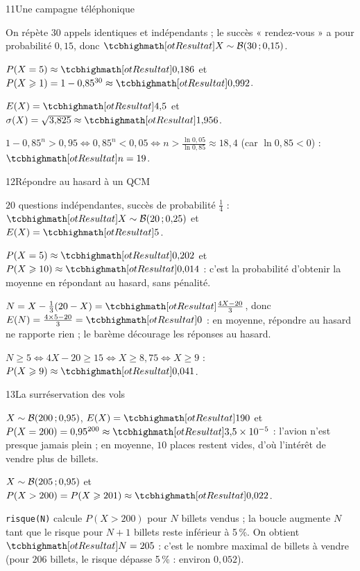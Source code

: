 \begin{corrige}{11}{Une campagne téléphonique}
\begin{questions}
  \item On répète $30$ appels identiques et indépendants ; le succès « rendez-vous » a pour probabilité $0{,}15$, donc
    $\res{X\sim\mathcal{B}(30\pv0{,}15)}$.
  \item $P(X=5)\approx\res{0{,}186}$ et $P(X\geq1)=1-0{,}85^{30}\approx\res{0{,}992}$.
  \item $E(X)=\res{4{,}5}$ et $\sigma(X)=\sqrt{3{,}825}\approx\res{1{,}956}$.
  \item $1-0{,}85^{n}>0{,}95\iff0{,}85^{n}<0{,}05\iff n>\frac{\ln0{,}05}{\ln0{,}85}\approx18{,}4$ (car $\ln0{,}85<0$) : $\res{n=19}$.
\end{questions}
\end{corrige}

\begin{corrige}{12}{Répondre au hasard à un QCM}
\begin{questions}
  \item $20$ questions indépendantes, succès de probabilité $\frac14$ : $\res{X\sim\mathcal{B}(20\pv0{,}25)}$ et $E(X)=\res{5}$.
  \item $P(X=5)\approx\res{0{,}202}$ et $P(X\geq10)\approx\res{0{,}014}$ : c'est la probabilité d'obtenir la moyenne en répondant au
    hasard, sans pénalité.
  \item $N=X-\frac13(20-X)=\res{\frac{4X-20}{3}}$, donc $E(N)=\frac{4\times5-20}{3}=\res{0}$ : en moyenne, répondre au hasard ne
    rapporte rien ; le barème décourage les réponses au hasard.
  \item $N\geq5\iff4X-20\geq15\iff X\geq8{,}75\iff X\geq9$ : $P(X\geq9)\approx\res{0{,}041}$.
\end{questions}
\end{corrige}

\begin{corrige}{13}{La surréservation des vols}
\begin{questions}
  \item $X\sim\mathcal{B}(200\,{;}\,0{,}95)$, $E(X)=\res{190}$ et $P(X=200)=0{,}95^{200}\approx\res{3{,}5\times10^{-5}}$ : l'avion n'est
    presque jamais plein ; en moyenne, $10$ places restent vides, d'où l'intérêt de vendre plus de billets.
  \item $X\sim\mathcal{B}(205\,{;}\,0{,}95)$ et $P(X>200)=P(X\geq201)\approx\res{0{,}022}$.
  \item \texttt{risque(N)} calcule $P(X>200)$ pour $N$ billets vendus ; la boucle augmente $N$ tant que le risque pour $N+1$
    billets reste inférieur à 5\,\%. On obtient $\res{N=205}$ : c'est le nombre maximal de billets à vendre (pour $206$ billets,
    le risque dépasse 5\,\% : environ $0{,}052$).
\end{questions}
\end{corrige}

